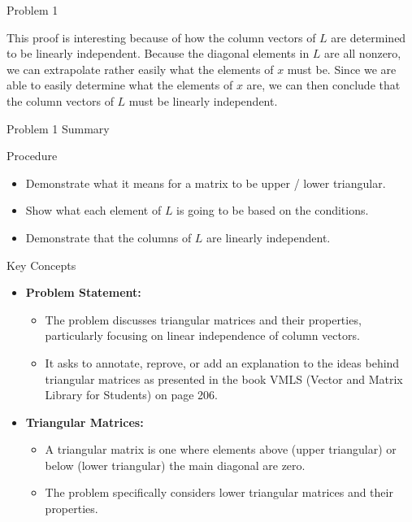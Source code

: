 \begin{problem}{Problem 1}
\begin{Highlight}[Solution]
        This proof is interesting because of how the column vectors of $L$ are determined to be linearly independent. Because the diagonal elements in $L$ are all nonzero, we can extrapolate rather easily
        what the elements of $x$ must be. Since we are able to easily determine what the elements of $x$ are, we can then conclude that the column vectors of $L$ must be linearly independent.
    \end{Highlight}
\end{problem}

\begin{summary}{Problem 1 Summary}
    \begin{statement}{Procedure}
        \begin{itemize}
            \item Demonstrate what it means for a matrix to be upper / lower triangular.
            \item Show what each element of $L$ is going to be based on the conditions.
            \item Demonstrate that the columns of $L$ are linearly independent.
        \end{itemize}
    \end{statement}
    \begin{statement}{Key Concepts}
        \begin{itemize}
            \item \textbf{Problem Statement:}
            \begin{itemize}
                \item The problem discusses triangular matrices and their properties, particularly focusing on linear independence of column vectors.
                \item It asks to annotate, reprove, or add an explanation to the ideas behind triangular matrices as presented in the book VMLS (Vector and Matrix Library for Students) on page 206.
            \end{itemize}
            \item \textbf{Triangular Matrices:}
            \begin{itemize}
                \item A triangular matrix is one where elements above (upper triangular) or below (lower triangular) the main diagonal are zero.
                \item The problem specifically considers lower triangular matrices and their properties.
            \end{itemize}

\end{itemize}
\end{statement}
\end{summary}
